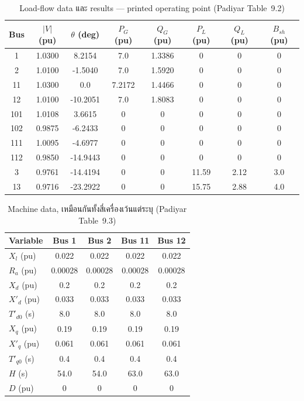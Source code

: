 \documentclass[12pt,a4paper]{article}
\begin{document}
\begin{table}[H]\centering\scriptsize
\caption{Load-flow data และ results --- printed operating point (Padiyar Table~9.2)}
\begin{tabular}{cccccccc}\toprule
Bus & $|V|$ (pu) & $\theta$ (deg) & $P_G$ (pu) & $Q_G$ (pu) & $P_L$ (pu) & $Q_L$ (pu) & $B_{sh}$ (pu)\\\midrule
1   & 1.0300 & 8.2154   & 7.0     & 1.3386 & 0      & 0     & 0\\
2   & 1.0100 & -1.5040  & 7.0     & 1.5920 & 0      & 0     & 0\\
11  & 1.0300 & 0.0      & 7.2172  & 1.4466 & 0      & 0     & 0\\
12  & 1.0100 & -10.2051 & 7.0     & 1.8083 & 0      & 0     & 0\\
101 & 1.0108 & 3.6615   & 0       & 0      & 0      & 0     & 0\\
102 & 0.9875 & -6.2433  & 0       & 0      & 0      & 0     & 0\\
111 & 1.0095 & -4.6977  & 0       & 0      & 0      & 0     & 0\\
112 & 0.9850 & -14.9443 & 0       & 0      & 0      & 0     & 0\\
3   & 0.9761 & -14.4194 & 0       & 0      & 11.59  & 2.12  & 3.0\\
13  & 0.9716 & -23.2922 & 0       & 0      & 15.75  & 2.88  & 4.0\\\bottomrule
\end{tabular}\end{table}

\begin{table}[H]\centering\scriptsize
\caption{Machine data, เหมือนกันทั้งสี่เครื่องเว้นแต่ระบุ (Padiyar Table~9.3)}
\begin{tabular}{lcccc}\toprule
Variable & Bus 1 & Bus 2 & Bus 11 & Bus 12\\\midrule
$X_l$ (pu)        & 0.022   & 0.022   & 0.022   & 0.022\\
$R_a$ (pu)        & 0.00028 & 0.00028 & 0.00028 & 0.00028\\
$X_d$ (pu)        & 0.2     & 0.2     & 0.2     & 0.2\\
$X'_d$ (pu)       & 0.033   & 0.033   & 0.033   & 0.033\\
$T'_{d0}$ (s)     & 8.0     & 8.0     & 8.0     & 8.0\\
$X_q$ (pu)        & 0.19    & 0.19    & 0.19    & 0.19\\
$X'_q$ (pu)       & 0.061   & 0.061   & 0.061   & 0.061\\
$T'_{q0}$ (s)     & 0.4     & 0.4     & 0.4     & 0.4\\
$H$ (s)           & 54.0    & 54.0    & 63.0    & 63.0\\
$D$ (pu)          & 0       & 0       & 0       & 0\\\bottomrule
\end{tabular}\end{table}
\end{document}
